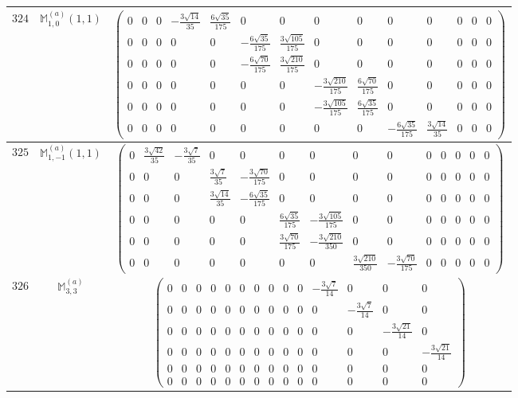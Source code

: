 \documentclass[fleqn,8pt,landscape]{jsarticle}
\begin{document}
\begin{center}
\begin{longtable}{ccc}
$ 324 $ & $ \mathbb{M}_{1,0}^{(a)}(1,1) $ & $ \begin{pmatrix} 0 & 0 & 0 & - \frac{3 \sqrt{14}}{35} & \frac{6 \sqrt{35}}{175} & 0 & 0 & 0 & 0 & 0 & 0 & 0 & 0 & 0 \\ 0 & 0 & 0 & 0 & 0 & - \frac{6 \sqrt{35}}{175} & \frac{3 \sqrt{105}}{175} & 0 & 0 & 0 & 0 & 0 & 0 & 0 \\ 0 & 0 & 0 & 0 & 0 & - \frac{6 \sqrt{70}}{175} & \frac{3 \sqrt{210}}{175} & 0 & 0 & 0 & 0 & 0 & 0 & 0 \\ 0 & 0 & 0 & 0 & 0 & 0 & 0 & - \frac{3 \sqrt{210}}{175} & \frac{6 \sqrt{70}}{175} & 0 & 0 & 0 & 0 & 0 \\ 0 & 0 & 0 & 0 & 0 & 0 & 0 & - \frac{3 \sqrt{105}}{175} & \frac{6 \sqrt{35}}{175} & 0 & 0 & 0 & 0 & 0 \\ 0 & 0 & 0 & 0 & 0 & 0 & 0 & 0 & 0 & - \frac{6 \sqrt{35}}{175} & \frac{3 \sqrt{14}}{35} & 0 & 0 & 0 \end{pmatrix} $ \\ \hline
$ 325 $ & $ \mathbb{M}_{1,-1}^{(a)}(1,1) $ & $ \begin{pmatrix} 0 & \frac{3 \sqrt{42}}{35} & - \frac{3 \sqrt{7}}{35} & 0 & 0 & 0 & 0 & 0 & 0 & 0 & 0 & 0 & 0 & 0 \\ 0 & 0 & 0 & \frac{3 \sqrt{7}}{35} & - \frac{3 \sqrt{70}}{175} & 0 & 0 & 0 & 0 & 0 & 0 & 0 & 0 & 0 \\ 0 & 0 & 0 & \frac{3 \sqrt{14}}{35} & - \frac{6 \sqrt{35}}{175} & 0 & 0 & 0 & 0 & 0 & 0 & 0 & 0 & 0 \\ 0 & 0 & 0 & 0 & 0 & \frac{6 \sqrt{35}}{175} & - \frac{3 \sqrt{105}}{175} & 0 & 0 & 0 & 0 & 0 & 0 & 0 \\ 0 & 0 & 0 & 0 & 0 & \frac{3 \sqrt{70}}{175} & - \frac{3 \sqrt{210}}{350} & 0 & 0 & 0 & 0 & 0 & 0 & 0 \\ 0 & 0 & 0 & 0 & 0 & 0 & 0 & \frac{3 \sqrt{210}}{350} & - \frac{3 \sqrt{70}}{175} & 0 & 0 & 0 & 0 & 0 \end{pmatrix} $ \\ \hline
$ 326 $ & $ \mathbb{M}_{3,3}^{(a)} $ & $ \begin{pmatrix} 0 & 0 & 0 & 0 & 0 & 0 & 0 & 0 & 0 & 0 & - \frac{3 \sqrt{7}}{14} & 0 & 0 & 0 \\ 0 & 0 & 0 & 0 & 0 & 0 & 0 & 0 & 0 & 0 & 0 & - \frac{3 \sqrt{7}}{14} & 0 & 0 \\ 0 & 0 & 0 & 0 & 0 & 0 & 0 & 0 & 0 & 0 & 0 & 0 & - \frac{3 \sqrt{21}}{14} & 0 \\ 0 & 0 & 0 & 0 & 0 & 0 & 0 & 0 & 0 & 0 & 0 & 0 & 0 & - \frac{3 \sqrt{21}}{14} \\ 0 & 0 & 0 & 0 & 0 & 0 & 0 & 0 & 0 & 0 & 0 & 0 & 0 & 0 \\ 0 & 0 & 0 & 0 & 0 & 0 & 0 & 0 & 0 & 0 & 0 & 0 & 0 & 0 \end{pmatrix} $ \\ \hline

\end{longtable}
\end{center}
\end{document}
